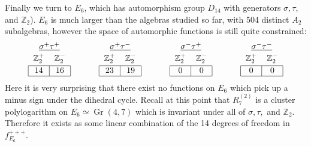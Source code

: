 \documentclass[11pt]{article}
\DeclareMathOperator{\Gr}{Gr}
\begin{document}
Finally we turn to $E_6$, which has automorphism group $D_{14}$ with generators $\sigma,\tau,$ and $\mathbb{Z}_2$). $E_6$ is much larger than the algebras studied so far, with 504 distinct $A_2$ subalgebras, however the space of automorphic functions is still quite constrained:
\begin{equation}
\begin{tabular}{| c | c |}
\multicolumn{2}{c}{$\underline{\sigma^+ \tau^+}$} \\[-1em]
\multicolumn{1}{c}{} & \multicolumn{1}{c}{} \\
\multicolumn{1}{c}{$\mathbb{Z}_2^+$} & \multicolumn{1}{c}{$\mathbb{Z}_2^-$} \\[-1em]
\multicolumn{1}{c}{} & \multicolumn{1}{c}{} \\
\hline
14 & 16 \\
\hline
\end{tabular} 
\hspace{1.2cm}
\begin{tabular}{| c | c |}
\multicolumn{2}{c}{$\underline{\sigma^+ \tau^-}$} \\[-1em]
\multicolumn{1}{c}{} & \multicolumn{1}{c}{} \\
\multicolumn{1}{c}{$\mathbb{Z}_2^+$} & \multicolumn{1}{c}{$\mathbb{Z}_2^-$} \\[-1em]
\multicolumn{1}{c}{} & \multicolumn{1}{c}{} \\
\hline
23 & 19 \\
\hline
\end{tabular} 
\hspace{1.2cm}
\begin{tabular}{| c | c |}
\multicolumn{2}{c}{$\underline{\sigma^- \tau^+}$} \\[-1em]
\multicolumn{1}{c}{} & \multicolumn{1}{c}{} \\
\multicolumn{1}{c}{$\mathbb{Z}_2^+$} & \multicolumn{1}{c}{$\mathbb{Z}_2^-$} \\[-1em]
\multicolumn{1}{c}{} & \multicolumn{1}{c}{} \\
\hline
0 & 0 \\
\hline
\end{tabular} 
\hspace{1.2cm}
\begin{tabular}{| c | c |}
\multicolumn{2}{c}{$\underline{\sigma^- \tau^-}$} \\[-1em]
\multicolumn{1}{c}{} & \multicolumn{1}{c}{} \\
\multicolumn{1}{c}{$\mathbb{Z}_2^+$} & \multicolumn{1}{c}{$\mathbb{Z}_2^-$} \\[-1em]
\multicolumn{1}{c}{} & \multicolumn{1}{c}{} \\
\hline
0 & 0 \\
\hline
\end{tabular} 
\end{equation}
Here it is very surprising that there exist no functions on $E_6$ which pick up a minus sign under the dihedral cycle. Recall at this point that $R^{(2)}_7$ is a cluster polylogarithm on $E_6\simeq \Gr(4,7)$ which is invariant under all of $\sigma, \tau,$ and $\mathbb{Z}_2$. Therefore it exists as some linear combination of the 14 degrees of freedom in $f_{E_6}^{+++}$. 
\end{document}
